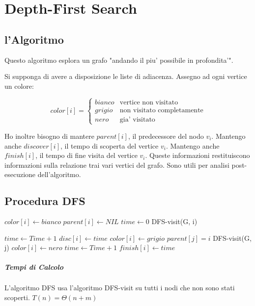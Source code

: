 \chapter{Depth-First Search}

\section{l'Algoritmo}

Questo algoritmo esplora un grafo "andando il piu' possibile in profondita'".

Si supponga di avere a disposizione le liste di adiacenza.
Assegno ad ogni vertice un colore:

\[
    color[i] = 
    \begin{cases}
        bianco & \text{vertice non visitato}\\
        grigio & \text{non visitato completamente}\\
        nero & \text{gia' visitato}
    \end{cases}
\]

Ho inoltre bisogno di mantere $parent[i]$, il predecessore del nodo $v_{i}$.
Mantengo anche $discover[i]$, il tempo di scoperta del vertice $v_{i}$.
Mantengo anche $finish[i]$, il tempo di fine visita del vertice $v_{i}$.
Queste informazioni restituiscono informazioni sulla relazione trai vari vertici del grafo. Sono utili per analisi post-esecuzione dell'algoritmo.

\newpage

\section{Procedura DFS}

\begin{algorithm}
    \begin{algorithmic}
                \State $color[i] \gets bianco$
                \State $parent[i] \gets NIL$
            \EndFor
            \State $time \gets 0$
                    \State DFS-visit(G, i)
                \EndIf
            \EndFor
         \EndProcedure
    \end{algorithmic}
\end{algorithm}

\begin{algorithm}
    \begin{algorithmic}
            \State $time \gets Time + 1$
            \State $disc[i] \gets time$
            \State $color[i] \gets grigio$
                    \State $parent[j] = i$
                    \State DFS-visit(G, j)
                \EndIf
            \EndFor
            \State $color[i] \gets nero$
            \State $time \gets Time + 1$
            \State $finish[i] \gets time$
        \EndProcedure
    \end{algorithmic}
\end{algorithm}

\paragraph{Tempi di Calcolo}

L'algoritmo DFS usa l'algoritmo DFS-visit su tutti i nodi che non sono stati scoperti.
$T(n) = \Theta(n + m)$

